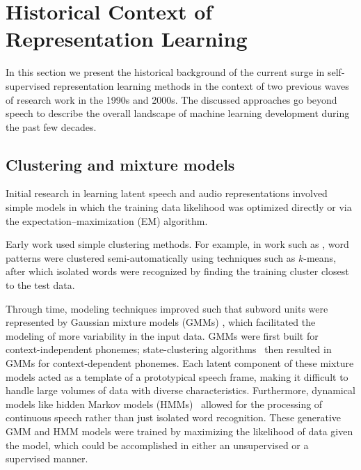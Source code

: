 
\section{Historical Context of Representation Learning}

\label{sec:thirdwave}

In this section we present the historical background of the current surge in
self-supervised representation learning methods in the context of two previous
waves of research work in the 1990s and 2000s. The discussed approaches go
beyond speech to describe the overall landscape of machine learning development during the
past few decades.

\subsection{Clustering and mixture models}

Initial research in learning latent speech and audio representations involved
simple models in which the training data likelihood was optimized directly
or via the expectation--maximization (EM) algorithm.

Early work used simple clustering methods. For example, in work such
as \cite{rabiner_considerations_1979,wilpon_modified_1985}, word patterns were clustered
semi-automatically using techniques such as $k$-means, after which isolated words
were recognized by finding the training cluster closest to 
  the test data.

Through time, modeling techniques improved such that subword units were
represented by Gaussian mixture models (GMMs) \cite{gauvain_maximum_1994}, which facilitated
the modeling of more variability in the input data. GMMs were first built for
context-independent phonemes; state-clustering 
algorithms~\cite{young_state_1994} then resulted in GMMs for context-dependent phonemes. 
Each latent component of these mixture models acted as a template of a
prototypical speech frame, 
making it difficult to handle 
large volumes of data with diverse characteristics. 
Furthermore, dynamical models like hidden Markov models (HMMs)~\cite{bell_adaptation_2021}
allowed for the processing of continuous speech rather than just isolated word
recognition. These generative GMM and HMM models were trained by maximizing the
likelihood of data given the model, which could be accomplished in either an
unsupervised or a supervised manner.

